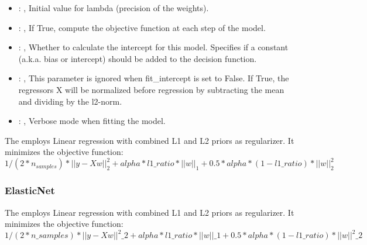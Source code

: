 \begin{itemize}
    \item {}: , 
      Initial value for lambda (precision of the weights).

    \item {}: , 
      If True, compute the objective function at each step of the
      model.

    \item {}: , 
      Whether to calculate the intercept for this model. Specifies if a constant (a.k.a. bias or
      intercept)                                                   should be added to the decision
      function.

    \item {}: , 
      This parameter is ignored when fit\_intercept is set to False. If True,
      the regressors X will be normalized before regression by subtracting the mean and
      dividing by the l2-norm.

    \item {}: , 
      Verbose mode when fitting the model.
  \end{itemize}
 The  employs                         Linear regression with combined L1 and L2
 priors as regularizer.                         It minimizes the objective function:
 \begin{equation}                         1/(2*n_{samples}) *||y - Xw||^2_2+alpha*l1\_ratio*||w||_1
 + 0.5 *alpha*(1 - l1\_ratio)*||w||^2_2                         \end{equation}

\subsubsection{ElasticNet}
  The  employs                         Linear regression with combined L1 and L2
  priors as regularizer.                         It minimizes the objective function:
  \begin{equation}                         1/(2*n\_{samples}) *||y - Xw||^2\_2+alpha*l1\_ratio*||w||\_1
  + 0.5 *alpha*(1 - l1\_ratio)*||w||^2\_2                         \end{equation}

